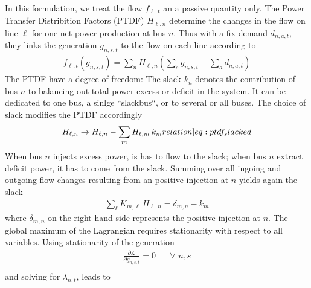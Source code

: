 \documentclass[11pt]{article}
\newcommand{\ubar}[1]{\underaccent{\bar}{#1}}
\newcommand{\generation}{g_{n,s,t}}
\newcommand{\opexGeneration}[1][n]{o_{#1,s}}
\newcommand{\demand}[1][n]{d_{#1,a,t}}
\newcommand{\incidence}[1][n]{K_{#1,\ell}}
\newcommand{\ptdf}[1][n]{H_{\ell,#1}}
\newcommand{\slack}[1][n]{k_{#1}}
\newcommand{\mulowergeneration}[1][n]{\ubar{\mu}_{#1,s,t}}
\newcommand{\muuppergeneration}[1][n]{\bar{\mu}_{#1,s,t}}
\newcommand{\mulowerflow}{\ubar{\mu}_{\ell,t}}
\newcommand{\muupperflow}{\bar{\mu}_{\ell,t}}
\newcommand{\lmp}[1][n]{\lambda_{#1,t}}
\newcommand{\flow}{f_{\ell,t}}
\newcommand{\injection}{p_{n,t}}
\newcommand{\lagrangian}{\mathcal{L}}
\newcommand{\Forall}[1]{\hspace{20pt} \forall \,\, #1 }
\newcommand{\pdv}[2]{\frac{\partial #1}{\partial #2}}
\begin{document}
In this formulation, we treat the flow $\flow$ an a passive quantity only. The Power Transfer Distribition Factors (PTDF) $\ptdf$ determine the changes in the flow on line $\ell$ for one net power production at bus $n$. Thus with a fix demand $\demand$, they links the generation $\generation$ to the flow on each line according to
\begin{align}
 \flow\left( \generation\right)  = \sum_n \ptdf \left( \sum_s \generation- \sum_a \demand \right)  %
\end{align}
The PTDF have a degree of freedom: The slack $\slack$ denotes the contribution of bus $n$ to balancing out total power excess or deficit in the system. It can be dedicated to one bus, a sinlge ``slackbus``, or to several or all buses. The choice of slack modifies the PTDF accordingly 
\begin{align}
 \ptdf  \rightarrow \ptdf - \sum_m \ptdf[m] \, \slack[m]
 \label[relation]{eq:ptdf_slacked}
\end{align}
When bus $n$ injects excess power, is has to flow to the slack; when bus $n$ extract deficit power, it has to come from the slack. Summing over all ingoing and outgoing flow changes resulting from an positive injection at $n$ yields again the slack 
\begin{align}
\sum_\ell \incidence[m] \, \ptdf =  \delta_{m,n} - \slack[m] 
\label{eq:slack}
\end{align}
where $\delta_{m,n}$ on the right hand side represents the positive injection at $n$.
The global maximum of the Lagrangian requires stationarity with respect to all variables. Using stationarity of the generation    
\begin{align}
 \pdv{\lagrangian}{\generation} = 0  \Forall{n,s} \\
\end{align}
and solving for $\lmp$, leads to 

\end{document}
